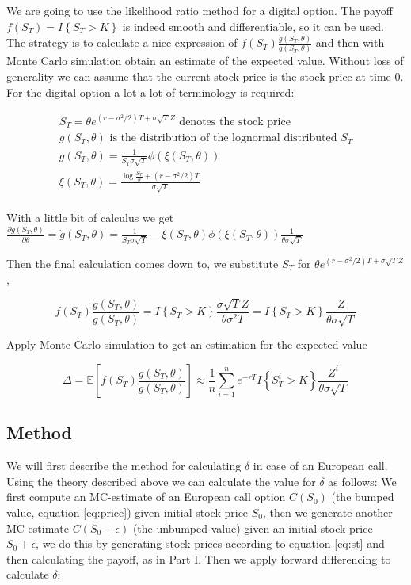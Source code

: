 \documentclass[11pt,a4paper]{article}
\begin{document}
We are going to use the likelihood ratio method for a digital option. The payoff $f(S_T)=I\left\{S_T>K\right\}$ is indeed smooth and differentiable, so it can be used. The strategy is to calculate a nice expression of $f(S_T) \frac{\dot{g}(S_T,\theta)}{g(S_T,\theta)}$ and then with Monte Carlo simulation obtain an estimate of the expected value. Without loss of generality we can assume that the current stock price is the stock price at time $0$. For the digital option a lot a lot of terminology is required:

\begin{align}
&S_T=\theta e^{(r-\sigma^2/2)T+\sigma\sqrt{T}Z} \text{   denotes the stock price}\\
&g(S_T,\theta) \text{   is the distribution of the lognormal distributed $S_T$}\\
&g(S_T,\theta)=\frac{1}{S_T\sigma\sqrt{T}}\phi(\xi(S_T,\theta)) &\\ &\xi(S_T,\theta)=\frac{\log\frac{S_T}{\theta}+(r-\sigma^2/2)T}{\sigma\sqrt{T}} &\\
\end{align}

With a little bit of calculus we get $\frac{\partial g(S_T,\theta)}{\partial \theta}=\dot{g}(S_T,\theta)=\frac{1}{S_T\sigma\sqrt{T}}-\xi(S_T,\theta)\phi(\xi(S_T,\theta))\frac{1}{\theta\sigma\sqrt{T}}$

Then the final calculation comes down to, we substitute $S_T$ for $\theta e^{(r-\sigma^2/2)T+\sigma\sqrt{T}Z}$,

\begin{equation}
f(S_T) \frac{\dot{g}(S_T,\theta)}{g(S_T,\theta)}=I\left\{S_T>K\right\}\frac{\sigma\sqrt{T}Z}{\theta\sigma^2T}=I\left\{S_T>K\right\}\frac{Z}{\theta\sigma\sqrt{T}}
\end{equation}

Apply Monte Carlo simulation to get an estimation for the expected value

\begin{equation}
\label{eq:likeli}
\Delta=\mathbb{E}\left[f(S_T) \frac{\dot{g}(S_T,\theta)}{g(S_T,\theta)}\right]\approx\frac{1}{n}\sum_{i=1}^n e^{-rT}I\left\{S^i_T>K\right\}\frac{Z^i}{\theta\sigma\sqrt{T}}
\end{equation}

\subsection{Method}
We will first describe the method for calculating $\delta$ in case of an European call. Using the theory described above we can calculate the value for $\delta$ as follows: We first compute an MC-estimate of an European call option $C(S_0)$ (the bumped value, equation \ref{eq:price}) given initial stock price $S_0$, then we generate another MC-estimate $C(S_0 + \epsilon)$ (the unbumped value) given an initial stock price $S_0 + \epsilon$, we do this by generating stock prices according to equation \ref{eq:st} and then calculating the payoff, as in Part I. Then we apply forward differencing to calculate $\delta$:
\end{document}
